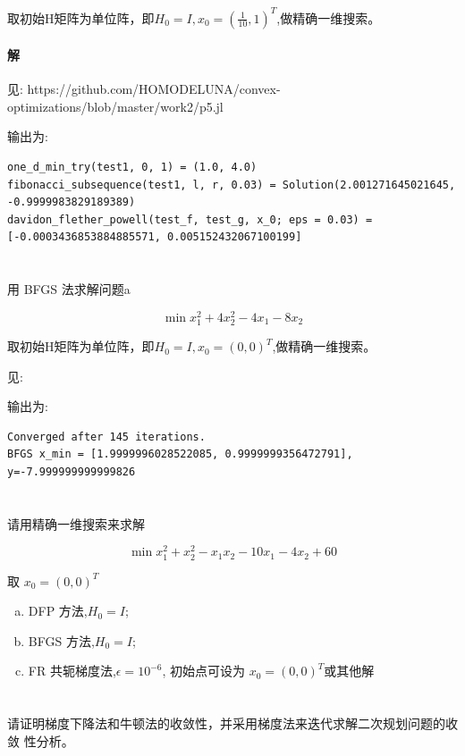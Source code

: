 \documentclass[a4paper]{article}
\begin{document}
取初始H矩阵为单位阵，即$H_0 = I, x_0 = (\frac{1}{10},1)^T$,做精确一维搜索。

\paragraph{解}

见: https://github.com/HOMODELUNA/convex-optimizations/blob/master/work2/p5.jl

输出为:
\begin{lstlisting}
one_d_min_try(test1, 0, 1) = (1.0, 4.0)
fibonacci_subsequence(test1, l, r, 0.03) = Solution(2.001271645021645, -0.9999983829189389)
davidon_flether_powell(test_f, test_g, x_0; eps = 0.03) = [-0.0003436853884885571, 0.005152432067100199]
\end{lstlisting}

\section{}

用 BFGS 法求解问题a

\[\min x_1^2 + 4x_2^2 - 4x_1 -8x_2\]

取初始H矩阵为单位阵，即$H_0 = I, x_0 = (0,0)^T$,做精确一维搜索。


见:

输出为:
\begin{lstlisting}
Converged after 145 iterations.
BFGS x_min = [1.9999996028522085, 0.9999999356472791], y=-7.999999999999826
\end{lstlisting}

\section{}

请用精确一维搜索来求解

\[\min x_1^2 + x_2^2 - x_1x_2 -10x_1 - 4x_2 + 60\]

取 $x_0 = (0,0)^T$

\begin{enumerate}[(a)]
    \item DFP 方法,$H_0 = I$;
    \item BFGS 方法,$H_0 = I$;
    \item FR 共轭梯度法,$\epsilon = 10^{-6}$, 初始点可设为 $x_0 = (0,0)^T$或其他解
\end{enumerate}

\section{}
请证明梯度下降法和牛顿法的收敛性，并采用梯度法来迭代求解二次规划问题的收敛
性分析。
\end{document}
